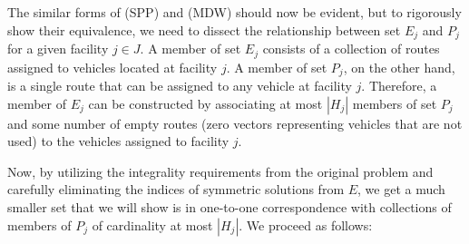 \documentclass[graybox]{./styles/svmult}
\begin{document}
The similar forms of (SPP) and (MDW) should now be evident, but to
rigorously show their equivalence, we need to dissect the relationship
between set $E_j$ and $P_j$ for a given facility $j \in J$. A member
of set $E_j$ consists of a collection of routes assigned to vehicles
located at facility $j$. A member of set $P_j$, on the other hand, is
a single route that can be assigned to any vehicle at facility $j$.
Therefore, a member of $E_j$ can be constructed by associating at most
$|H_j|$ members of set $P_{j}$ and some number of empty routes (zero
vectors representing vehicles that are not used) to the vehicles
assigned to facility $j$.

Now, by utilizing the integrality requirements from the original
problem and carefully eliminating the indices of symmetric solutions
from $E$, we get a much smaller set that we will show is in one-to-one
correspondence with collections of members of $P_j$ of cardinality at
most $|H_j|$. We proceed as follows:
\end{document}
